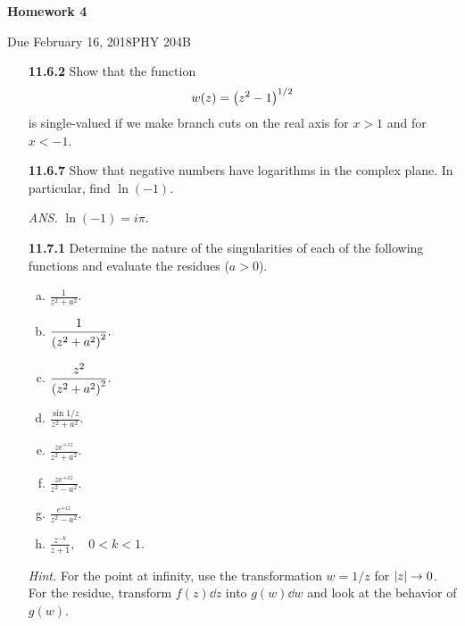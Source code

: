 \documentclass{article}
\newcommand{\Title}     {Homework 4}
\newcommand{\DueDate}   {February 16, 2018}
\newcommand{\Course}    {PHY 204B}
\begin{document}
{\huge\textbf{\Title}}

Due \DueDate \hfill \Course

\hrulefill

\begin{enumerate}[align=parleft,labelsep=26pt]
    \item [\textbf{11.6.2}] Show that the function
    \[
        w(z) = \pqty{z^2-1}^{1/2}
    \]
    is single-valued if we make branch cuts on the real axis for $x>1$ and for $x<-1$.

    \item [\textbf{11.6.7}] Show that negative numbers have logarithms in the complex plane. In particular, find $\ln(-1)$.

    \hfill \textit{ANS. } $\ln(-1) = i\pi$.

    \item [\textbf{11.7.1}] Determine the nature of the singularities of each of the following functions and evaluate the residues ($a>0$).
    \begin{multicols}{2}
        \begin{enumerate}[(a)]
            \item \(\displaystyle
                \frac{1}{z^2+a^2}.
            \)
            \item \(\displaystyle
                \frac{1}{\pqty{z^2+a^2}^2}.
            \)
            \item \(\displaystyle
                \frac{z^2}{\pqty{z^2+a^2}^2}.
            \)
            \item \(\displaystyle
                \frac{\sin 1/z}{z^2+a^2}.
            \)
            \item \(\displaystyle
                \frac{ze^{+iz}}{z^2+a^2}.
            \)
            \item \(\displaystyle
                \frac{ze^{+iz}}{z^2-a^2}.
            \)
            \item \(\displaystyle
                \frac{e^{+iz}}{z^2-a^2}.
            \)
            \item \(\displaystyle
                \frac{z^{-k}}{z+1},\quad 0<k<1.
            \)
        \end{enumerate}
    \end{multicols}
    \textit{Hint.} For the point at infinity, use the transformation $w = 1/z$ for $\abs{z}\to 0$. For the residue, transform $f(z)\dd{z}$ into $g(w)\dd{w}$ and look at the behavior of $g(w)$.


\end{enumerate}
\end{document}
